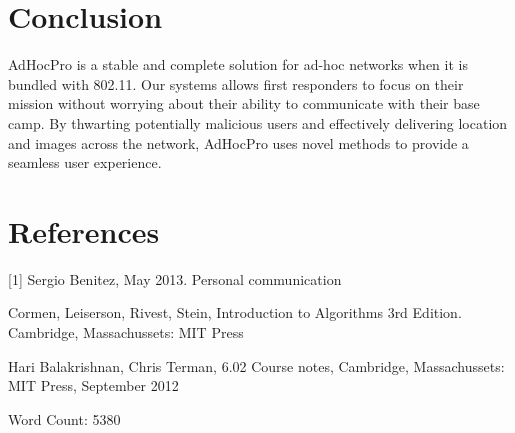 \documentclass[letterpaper]{article}
\begin{document}
\section{Conclusion}

AdHocPro is a stable and complete solution for ad-hoc networks when it is bundled with 802.11. Our systems allows first responders to
focus on their mission without worrying about their ability to communicate with their base camp. By thwarting potentially malicious
users and effectively delivering location and images across the network, AdHocPro uses novel methods to provide a seamless user experience.

\section{References}

[1] Sergio Benitez, May 2013. Personal communication

\noindent[2] Cormen, Leiserson, Rivest, Stein, Introduction to Algorithms 3rd Edition. Cambridge, Massachussets: MIT Press

\noindent[3] Hari Balakrishnan, Chris Terman, 6.02 Course notes, Cambridge, Massachussets: MIT Press, September 2012

\noindent Word Count: 5380
\end{document}

